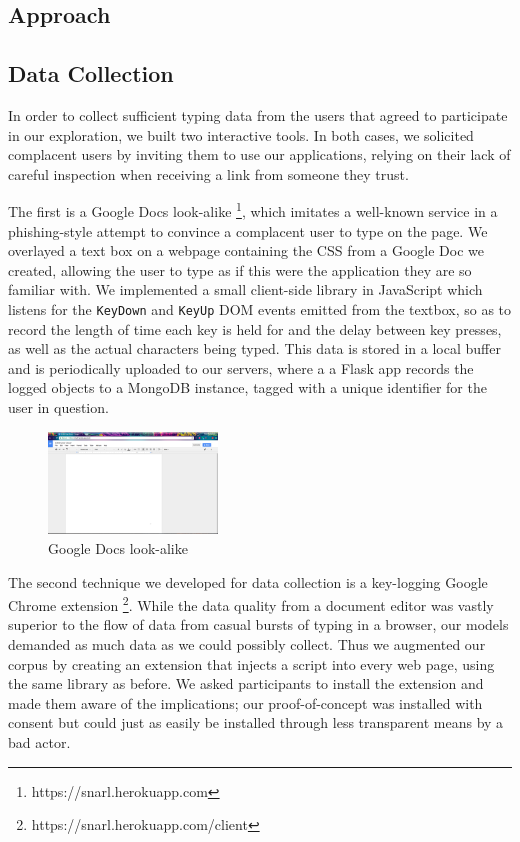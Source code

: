 \documentclass{amsart}
\begin{document}
\begin{multicols*}{2}
\section{Approach}
\subsection{Data Collection}

In order to collect sufficient typing data from the users that agreed to participate in our exploration, we built two interactive tools. In both cases, we solicited complacent users by inviting them to use our applications, relying on their lack of careful inspection when receiving a link from someone they trust.

The first is a Google Docs look-alike \footnote{https://snarl.herokuapp.com}, which imitates a well-known service in a phishing-style attempt to convince a complacent user to type on the page. We overlayed a text box on a webpage containing the CSS from a Google Doc we created, allowing the user to type as if this were the application they are so familiar with. We implemented a small client-side library in JavaScript which listens for the \texttt{KeyDown} and \texttt{KeyUp} DOM events emitted from the textbox, so as to record the length of time each key is held for and the delay between key presses, as well as the actual characters being typed. This data is stored in a local buffer and is periodically uploaded to our servers, where a a Flask app records the logged objects to a MongoDB instance, tagged with a unique identifier for the user in question.

\begin{figure}[H]
  \centering
  \includegraphics[width=0.4\textwidth]{gdocs}
  \caption{Google Docs look-alike}
\end{figure}

The second technique we developed for data collection is a key-logging Google Chrome extension \footnote{https://snarl.herokuapp.com/client}. While the data quality from a document editor was vastly superior to the flow of data from casual bursts of typing in a browser, our models demanded as much data as we could possibly collect. Thus we augmented our corpus by creating an extension that injects a script into every web page, using the same library as before. We asked participants to install the extension and made them aware of the implications; our proof-of-concept was installed with consent but could just as easily be installed through less transparent means by a bad actor.


\end{multicols*}
\end{document}
